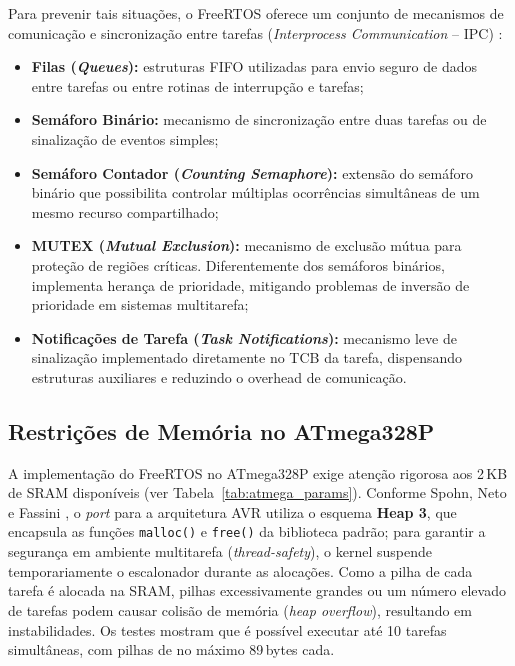 \documentclass[repeatfields,xlists,xpacks,oneside]{ufrgscca}
\begin{document}
Para prevenir tais situações, o FreeRTOS oferece um conjunto de mecanismos de comunicação e sincronização entre tarefas (\textit{Interprocess Communication} -- IPC) \cite{barry2016freertos}:

\begin{itemize}
    \item \textbf{Filas (\textit{Queues}):} estruturas FIFO utilizadas para envio seguro de dados entre tarefas ou entre rotinas de interrupção e tarefas;

    \item \textbf{Semáforo Binário:} mecanismo de sincronização entre duas tarefas ou de sinalização de eventos simples;

    \item \textbf{Semáforo Contador (\textit{Counting Semaphore}):} extensão do semáforo binário que possibilita controlar múltiplas ocorrências simultâneas de um mesmo recurso compartilhado;

    \item \textbf{MUTEX (\textit{Mutual Exclusion}):} mecanismo de exclusão mútua para proteção de regiões críticas. Diferentemente dos semáforos binários, implementa herança de prioridade, mitigando problemas de inversão de prioridade em sistemas multitarefa;

    \item \textbf{Notificações de Tarefa (\textit{Task Notifications}):} mecanismo leve de sinalização implementado diretamente no TCB da tarefa, dispensando estruturas auxiliares e reduzindo o overhead de comunicação.
\end{itemize}

\subsection{Restrições de Memória no ATmega328P}

A implementação do FreeRTOS no ATmega328P exige atenção rigorosa aos 2\,KB de SRAM disponíveis (ver Tabela~\ref{tab:atmega_params}). Conforme Spohn, Neto e Fassini \citeyear{SPOHN:FreeRTOS-Arduino-2019}, o \textit{port} para a arquitetura AVR utiliza o esquema \textbf{Heap 3}, que encapsula as funções \texttt{malloc()} e \texttt{free()} da biblioteca padrão; para garantir a segurança em ambiente multitarefa (\textit{thread-safety}), o kernel suspende temporariamente o escalonador durante as alocações. Como a pilha de cada tarefa é alocada na SRAM, pilhas excessivamente grandes ou um número elevado de tarefas podem causar colisão de memória (\textit{heap overflow}), resultando em instabilidades. Os testes mostram que é possível executar até 10 tarefas simultâneas, com pilhas de no máximo 89\,bytes cada.
\end{document}
